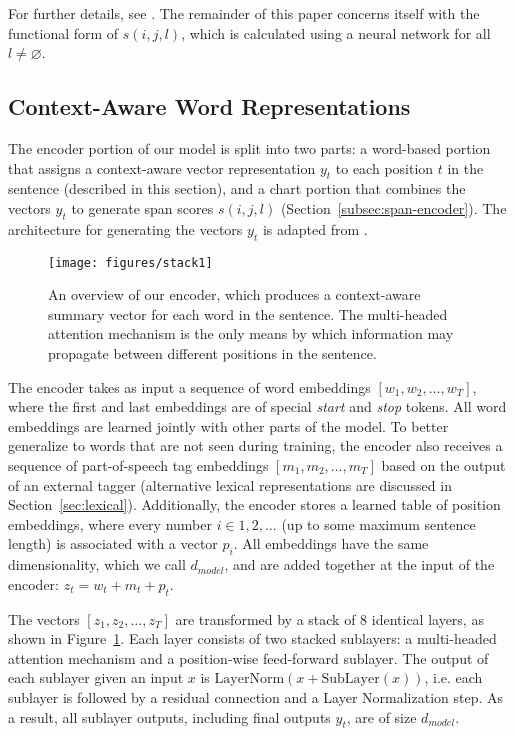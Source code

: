 \documentclass[11pt,a4paper]{article}
\begin{document}
For further details, see \citet{gaddy_analysis_2018}. The remainder of this paper concerns itself with the functional form of $s(i,j,l)$, which is calculated using a neural network for all $l \neq \varnothing$.

\subsection{Context-Aware Word Representations}
\label{subsec:linear-encoder}

The encoder portion of our model is split into two parts: a word-based portion that assigns a context-aware vector representation $y_t$ to each position $t$ in the sentence (described in this section), and a chart portion that combines the vectors $y_t$ to generate span scores $s(i,j,l)$ (Section~\ref{subsec:span-encoder}). The architecture for generating the vectors $y_t$ is adapted from \citet{vaswani_attention_2017}.

\begin{figure}
  \centering
    \texttt{[image: figures/stack1]}
    \caption{An overview of our encoder, which produces a context-aware summary vector for each word in the sentence. The multi-headed attention mechanism is the only means by which information may propagate between different positions in the sentence.}
    \label{fig:linear-encoder}
\end{figure}

The encoder takes as input a sequence of word embeddings $[w_1, w_2, \ldots, w_T]$, where the first and last embeddings are of special \emph{start} and \emph{stop} tokens. All word embeddings are learned jointly with other parts of the model. To better generalize to words that are not seen during training, the encoder also receives a sequence of part-of-speech tag embeddings $[m_1, m_2, \ldots, m_T]$ based on the output of an external tagger (alternative lexical representations are discussed in Section~\ref{sec:lexical}). Additionally, the encoder stores a learned table of position embeddings, where every number $i \in 1,2,\ldots$ (up to some maximum sentence length) is associated with a vector $p_i$. All embeddings have the same dimensionality, which we call $d_{model}$, and are added together at the input of the encoder: $z_t = w_t + m_t + p_t$.

The vectors $[z_1, z_2, \ldots, z_T]$ are transformed by a stack of 8 identical layers, as shown in Figure~\ref{fig:linear-encoder}. Each layer consists of two stacked sublayers: a multi-headed attention mechanism and a position-wise feed-forward sublayer. The output of each sublayer given an input $x$ is $\mathrm{LayerNorm}(x + \mathrm{SubLayer}(x))$, i.e. each sublayer is followed by a residual connection and a Layer Normalization \citep{ba_layer_2016} step.
As a result, all sublayer outputs, including final outputs $y_t$, are of size $d_{model}$.
\end{document}

